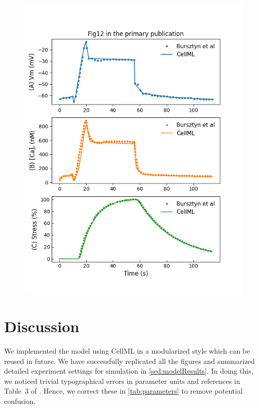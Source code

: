 \documentclass[fleqn,10pt]{physiome}
\begin{document}
\begin{figure}
\begin{minipage}[t]{\dimexpr.5\textwidth-0.2em}
  \includegraphics[width=\linewidth]{./figs/simFig12.png}
  \label{simFig12}
\end{minipage}
\end{figure}

\section{Discussion}
\label{sec:discussion}
We implemented the model \citep{bursztyn2007mathematical} using CellML in a modularized style which can be reused in future. We have successfully replicated all the figures and summarized detailed experiment settings for simulation in \autoref{sed:modelResults}. 
In doing this, we noticed trivial typographical errors in parameter units and references in Table~$3$ of \cite{bursztyn2007mathematical}. Hence, we correct these in \autoref{tab:parameters} to remove potential confusion.
\end{document}

